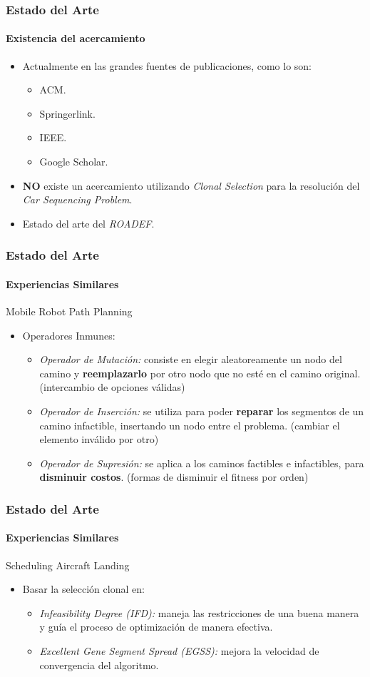 \frame
{
\frametitle{Estado del Arte}
\framesubtitle{Existencia del acercamiento}
\begin{itemize}
    \item Actualmente en las grandes fuentes de publicaciones, como lo son:
    \begin{itemize}
        \item ACM.
        \item Springerlink.
        \item IEEE.
        \item Google Scholar.
    \end{itemize}
    \item \textbf{NO} existe un acercamiento utilizando \emph{Clonal Selection}
        para la resolución del \emph{Car Sequencing Problem}.
    \item Estado del arte del \emph{ROADEF}.
\end{itemize}
}

\frame
{
\frametitle{Estado del Arte}
\framesubtitle{Experiencias Similares}
\begin{block}{Mobile Robot Path Planning}
\begin{itemize}
    \item Operadores Inmunes:
     \begin{itemize}
        \item \emph{Operador de Mutación:}
            consiste en elegir aleatoreamente un nodo del camino y \textbf{reemplazarlo} por otro nodo que no esté en el camino original. (intercambio de opciones válidas)
        \item \emph{Operador de Inserción:}
            se utiliza para poder \textbf{reparar} los segmentos de un camino infactible, insertando un nodo entre el problema. (cambiar el elemento inválido por otro)
        \item \emph{Operador de Supresión:}
            se aplica a los caminos factibles e infactibles, para \textbf{disminuir costos}. (formas de disminuir el fitness por orden)
     \end{itemize}
\end{itemize}
\end{block}
}

\frame
{
\frametitle{Estado del Arte}
\framesubtitle{Experiencias Similares}
\begin{block}{Scheduling Aircraft Landing}
\begin{itemize}
    \item Basar la selección clonal en:
    \begin{itemize}
        \item \emph{Infeasibility Degree (IFD):}
            maneja las restricciones de una buena manera y guía el proceso de optimización de manera efectiva.
        \item \emph{Excellent Gene Segment Spread (EGSS):}
            mejora la velocidad de convergencia del algoritmo.
    \end{itemize}
\end{itemize}
\end{block}
}

